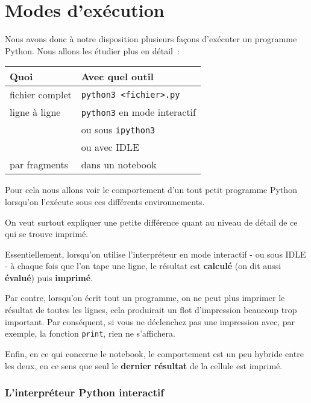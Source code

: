    
    
    
    

    

    \hypertarget{modes-dexuxe9cution}{%
\section{Modes d'exécution}\label{modes-dexuxe9cution}}

    Nous avons donc à notre disposition plusieurs façons d'exécuter un
programme Python. Nous allons les étudier plus en détail~:

    \begin{longtable}[]{@{}ll@{}}
\toprule
Quoi & Avec quel outil\tabularnewline
\midrule
\endhead
fichier complet &
\texttt{python3\ \textless{}fichier\textgreater{}.py}\tabularnewline
ligne à ligne & \texttt{python3} en mode interactif\tabularnewline
~ & ou sous \texttt{ipython3}\tabularnewline
~ & ou avec IDLE\tabularnewline
par fragments & dans un notebook\tabularnewline
\bottomrule
\end{longtable}

    Pour cela nous allons voir le comportement d'un tout petit programme
Python lorsqu'on l'exécute sous ces différents environnements.

On veut surtout expliquer une petite différence quant au niveau de
détail de ce qui se trouve imprimé.

    Essentiellement, lorsqu'on utilise l'interpréteur en mode interactif -
ou sous IDLE - à chaque fois que l'on tape une ligne, le résultat est
\textbf{calculé} (on dit aussi \textbf{évalué}) puis \textbf{imprimé}.

Par contre, lorsqu'on écrit tout un programme, on ne peut plus imprimer
le résultat de toutes les lignes, cela produirait un flot d'impression
beaucoup trop important. Par conséquent, si vous ne déclenchez pas une
impression avec, par exemple, la fonction \texttt{print}, rien ne
s'affichera.

Enfin, en ce qui concerne le notebook, le comportement est un peu
hybride entre les deux, en ce sens que seul le \textbf{dernier résultat}
de la cellule est imprimé.

    \hypertarget{linterpruxe9teur-python-interactif}{%
\subsubsection{L'interpréteur Python
interactif}\label{linterpruxe9teur-python-interactif}}

